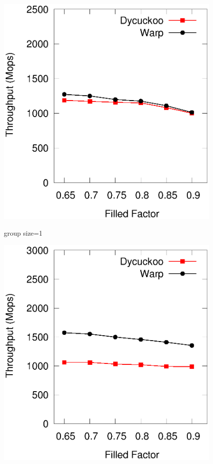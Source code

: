 \iffalse
\begin{figure}[htp]
	\begin{minipage}{0.16\linewidth}\centering
		\includegraphics[width=\linewidth]{pic/group-size/g1-insert.eps}
		\centerline{group size=1}
	\end{minipage}
	\begin{minipage}{0.16\linewidth}\centering
		\includegraphics[width=\linewidth]{pic/group-size/g2-insert.eps}

\end{minipage}
\end{figure}
